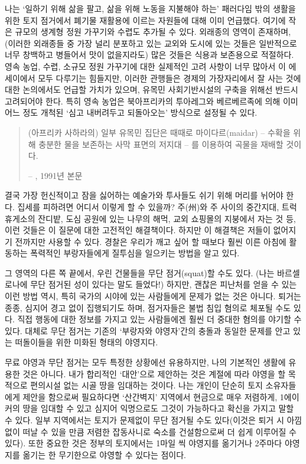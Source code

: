 \documentclass[10pt, b6paper, openany]{memoir}
\begin{document}
\begin{article}
나는 `일하기 위해 삶을 팔고, 삶을 위해 노동을 지불해야 하는' 패러다임 밖의 생활을 위한 토지 점거에서 폐기물 재활용에 이르는 자원들에 대해 이미 언급했다. 여기에 작은 규모의 생계형 정원 가꾸기와 수렵도 추가될 수 있다. 외래종의 영역이 존재하며, (이러한 외래종들 중 가장 널리 분포하고 있는 교외와 도시에 있는 것들은 일반적으로 너무 창백하고 병들어서 맛이 없을지라도) 많은 것들은 식용과 보존용으로 적절하다. 영속 농업, 수렵, 소규모 정원 가꾸기에 대한 실제적인 고려 사항이 너무 많아서 이 에세이에서 모두 다루기는 힘들지만, 이러한 관행들은 경제의 가장자리에서 잘 사는 것에 대한 논의에서도 언급할 가치가 있으며, 유목민 사회기반시설의 구축을 위해선 반드시 고려되어야 한다. 특히 영속 농업은 북아프리카의 투아레그와 베르베르족에 의해 이미 어느 정도 개척된 `심고 내버려두고 되돌아오는' 방식으로 설정될 수 있다.

\begin{quote}
(아프리카 사하라의) 일부 유목민 집단은 때때로 마이다르(maidar) -- 수확을 위해 충분한 물을 보존하는 사막 표면의 저지대 -- 를 이용하여 곡물을 재배할 것이다.

-- , 1991년 본문
\end{quote}

결국 가장 헌신적이고 잠을 싫어하는 예술가와 투사들도 쉬기 위해 머리를 뉘어야 한다. 집세를 피하려면 어디서 이렇게 할 수 있을까? 주(州)와 주 사이의 중간지대, 트럭 휴게소의 잔디밭, 도심 공원에 있는 나무의 해먹, 교외 쇼핑몰의 지붕에서 자는 것 등, 이런 것들은 이 질문에 대한 고전적인 해결책이다. 하지만 이 해결책은 저들이 없어지기 전까지만 사용할 수 있다. 경찰은 우리가 깨고 싶어 할 때보다 훨씬 이른 아침에 활동하는 폭력적인 부랑자들에게 질투심을 일으키는 방법을 알고 있다.

그 영역의 다른 쪽 끝에서, 우린 건물들을 무단 점거(squat)할 수도 있다. (나는 바르셀로나에 무단 점거된 성이 있다는 말도 들었다!) 하지만, 괜찮은 피난처를 얻을 수 있는 이런 방법 역시, 특히 국가의 시야에 있는 사람들에게 문제가 없는 것은 아니다. 퇴거는 종종, 심지어 경고 없이 집행되기도 하며, 점거자들은 불법 침입 혐의로 체포될 수도 있다. 직접 행동에 대한 정보를 가지고 있는 사람들에겐 훨씬 더 중대한 혐의를 야기할 수 있다. 대체로 무단 점거는 기존의 ‘부랑자와 야영자’간의 충돌과 동일한 문제를 안고 있는 떠돌이들을 위한 미화된 형태의 야영지다.

무료 야영과 무단 점거는 모두 특정한 상황에선 유용하지만, 나의 기본적인 생활에 유용한 것은 아니다. 내가 합리적인 `대안'으로 제안하는 것은 계절에 따라 야영을 할 목적으로 편의시설 없는 시골 땅을 임대하는 것이다. 나는 개인이 단순히 토지 소유자들에게 제안을 함으로써 필요하다면 `산간벽지' 지역에서 현금으로 매우 저렴하게, 1에이커의 땅을 임대할 수 있고 심지어 익명으로도 그것이 가능하다고 확신을 가지고 말할 수 있다. 일부 지역에서는 토지가 문제없이 무단 점거될 수도 있다(이것은 퇴거 시 아낌없이 떠날 수 있을 만큼 저렴한 잡동사니로 숙소를 건설함으로써 더 쉽게 이루어질 수 있다). 또한 중요한 것은 정부의 토지에서는 1마일 씩 야영지를 옮기거나 2주마다 야영지를 옮기는 한 무기한으로 야영할 수 있다는 점이다.


\end{article}
\end{document}
